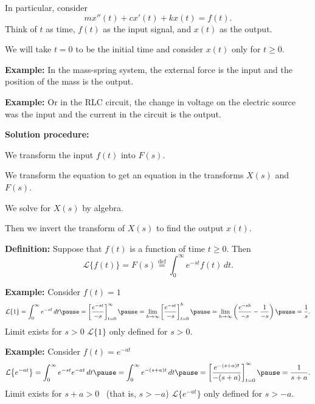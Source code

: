 \documentclass[10pt,aspectratio=169]{beamer}
\begin{document}
\begin{frame}
In particular, consider
\[
m x''(t) + c x'(t) + k x(t) = f(t) .
\]
Think of $t$ as time, $f(t)$ as the input signal, and $x(t)$ as the output.

\medskip
\pause

We will take $t=0$ to be the initial time and consider $x(t)$
only for $t \geq 0$.

\medskip
\pause

\textbf{Example:} In the mass-spring system, the external force is the input and
the position of the mass is the output.

\medskip
\pause

\textbf{Example:}
Or in the RLC circuit, the change in voltage on the electric source
was the input and the current in the circuit is the output.

\medskip
\pause

\textbf{Solution procedure:}

We transform the input $f(t)$ into $F(s)$.

\medskip
\pause

We transform the equation to get an equation in the transforms $X(s)$ and
$F(s)$.

\medskip
\pause

We solve for $X(s)$ by algebra.

\medskip
\pause

Then we invert the transform of $X(s)$ to find the output $x(t)$.

\end{frame}

\begin{frame}
\textbf{Definition:}  Suppose that $f(t)$ is a function of time $t \geq 0$.
Then
\[
\mathcal{L} \bigl\{ f(t) \bigr\} =
F(s) \overset{\text{def}}{=} \int_0^\infty e^{-st} f(t) \, dt .
\]
\pause

\textbf{Example:}
Consider $f(t) = 1$
\begin{equation*}
\mathcal{L} \{1\} = \int_0^\infty e^{-st} \, dt
\pause
=
\left[ \frac{e^{-st}}{-s} \right]_{t=0}^\infty
\pause
=
\lim_{h\to\infty}
\left[ \frac{e^{-st}}{-s} \right]_{t=0}^h
\pause
=
\lim_{h\to\infty}
\left( \frac{e^{-sh}}{-s} - \frac{1}{-s} \right)
\pause
= \frac{1}{s} .
\end{equation*}
Limit exists for $s > 0$
\pause
\wthus
$\mathcal{L} \{1\}$ only defined for $s > 0$.

\medskip
\pause

\textbf{Example:}
Consider
$f(t) = e^{-at}$
\begin{equation*}
\mathcal{L} \bigl\{e^{-at}\bigr\}
= \int_0^\infty e^{-st} e^{-at} \, dt
\pause
= \int_0^\infty e^{-(s+a)t} \, dt
\pause
=
\left[ \frac{e^{-(s+a)t}}{-(s+a)} \right]_{t=0}^\infty
\pause
= \frac{1}{s+a} .
\end{equation*}
Limit exists for $s+a > 0$  ~(that is, $s > -a$)
\pause
\wthus
$\mathcal{L} \bigl\{e^{-at}\bigr\}$ only defined for $s > -a$.

\end{frame}
\end{document}
